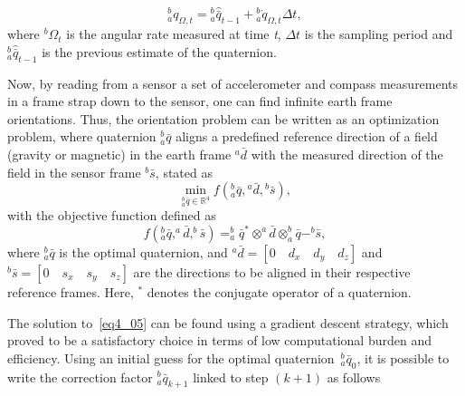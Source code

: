 \begin{equation}
\label{eq4_04}
^b_a q_{\Omega,t} = {^b_a \hat{\bar{q}}_{t-1}} + {^b_a \dot{q}_{\Omega,t}} \Delta t,
\end{equation}
where $^b \Omega_t$ is the angular rate measured at time \textit{t}, $\Delta t$ is the sampling period and $^b_a \hat{\bar{q}}_{t-1}$ is the previous estimate of the quaternion.

Now, by reading from a sensor a set of accelerometer and compass measurements in a frame strap down to the sensor, one can find infinite earth frame orientations.
Thus, the orientation problem can be written as an optimization problem, where quaternion $^b_a \bar{q}$ aligns a predefined reference direction of a field (gravity or magnetic) in the earth frame $^a \bar{d}$ with the measured direction of the field in the sensor frame $^b \bar{s}$, stated as
\begin{equation}
\label{eq4_05}
\min_{{^b_a \bar{q}} \in \mathbb{R}^4} f({^b_a \bar{q}}, {^a \bar{d}}, {^b \bar{s}}),
\end{equation}
with the objective function defined as
\begin{equation}
\label{eq4_06}
f(^b_a \bar{q},^a \bar{d}, ^b \bar{s}) = ^b_a \bar{q}^{*} \otimes ^a \bar{d} \otimes ^b_a \bar{q} - ^b \bar{s},
\end{equation}
where $^b_a \bar{q}$ is the optimal quaternion, and $^a \bar{d} = [0 \quad d_x \quad d_y \quad d_z]$ and $^b \bar{s} = [0 \quad s_x \quad s_y \quad s_z]$ are the directions to be aligned in their respective reference frames. Here, $^{*}$ denotes the conjugate operator of a quaternion. 

The solution to~\eqref{eq4_05} can be found using a gradient descent strategy, which proved to be a satisfactory choice in terms of low computational burden and efficiency. Using an initial guess for the optimal quaternion~$^b_a \bar{q}_0$, it is possible to write the correction factor $^b_a \bar{q}_{k+1}$ linked to step $(k+1)$ as follows

